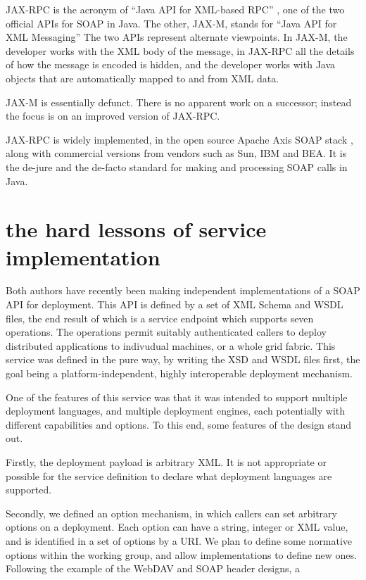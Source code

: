 \documentclass[draft]{paper}
\begin{document}
JAX-RPC is the acronym of ``Java API for XML-based RPC'' \cite{spec:JAX-RPC-11}, 
one of the two official APIs for SOAP in Java. 
The other, JAX-M, stands for ``Java API for XML Messaging'' \cite{spec:JAX-M-11}
The two APIs represent alternate viewpoints. In JAX-M, the developer works with the
XML body of the message, in JAX-RPC all the details of how the message is encoded
is hidden, and the developer works with Java objects that are automatically mapped
to and from XML data. 

JAX-M is essentially defunct. There is no apparent work on a successor;
instead the focus is on an improved version of JAX-RPC. 

JAX-RPC is widely implemented, in the open source Apache Axis SOAP stack \cite{axis},
along with commercial versions from vendors such as Sun, IBM and BEA. It is the de-jure
and the de-facto standard for making and processing SOAP calls in Java. 


\section{the hard lessons of service implementation}

Both authors have recently been making independent implementations of a SOAP API
for deployment. This API is defined by a set of XML Schema and WSDL files, the
end result of which is a service endpoint which supports seven operations. The 
operations permit suitably authenticated callers to deploy distributed applications
to indivudual machines, or a whole grid fabric. This service was defined in the pure way, 
by writing the XSD and WSDL files first, the goal being a platform-independent, highly
interoperable deployment mechanism. 

One of the features of this service was that it was intended to support 
multiple deployment languages, and multiple deployment engines, each potentially
with different capabilities and options. To this end, some features of the design
stand out. 

Firstly, the deployment payload is arbitrary XML. It is not appropriate 
or possible for the service definition to declare what deployment languages are 
supported. 

Secondly, we defined an option mechanism, in which callers can set
arbitrary options on a deployment. Each option can have a string, integer or XML value,
and is identified in a set of options by a URI. We plan to define some normative options
within the working group, and allow implementations to define new ones. 
Following the example of the WebDAV and SOAP header designs, a 
\end{document}
